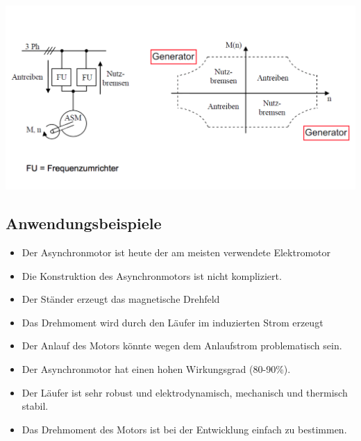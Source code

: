 \begin{minipage}{0.4 \linewidth}
\includegraphics[width = \linewidth]{./Pics/VL1213/Umrichter}
\end{minipage}
\begin{minipage}{0.6 \linewidth}
\subsection{Anwendungsbeispiele}
\begin{itemize}
\item Der Asynchronmotor ist heute der am meisten verwendete Elektromotor
\item Die Konstruktion des Asynchronmotors ist nicht kompliziert.
\item Der Ständer erzeugt das magnetische Drehfeld
\item Das Drehmoment wird durch den Läufer im induzierten Strom erzeugt
\item Der Anlauf des Motors könnte wegen dem Anlaufstrom problematisch sein.
\item Der Asynchronmotor hat einen hohen Wirkungsgrad (80-90\%).
\item Der Läufer ist sehr robust und elektrodynamisch, mechanisch und thermisch stabil.
\item Das Drehmoment des Motors ist bei der Entwicklung einfach zu bestimmen.
\end{itemize}
\end{minipage}